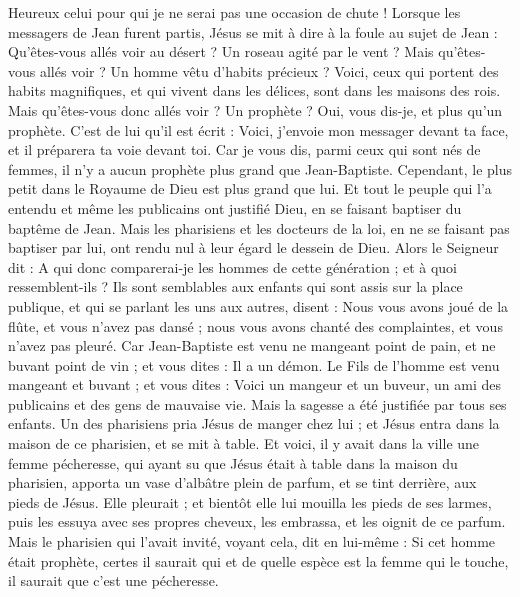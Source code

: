 \begin{multicols}{2}
Heureux celui pour qui je ne serai pas une occasion de chute !
Lorsque les messagers de Jean furent partis, Jésus se mit à dire à la foule au sujet de Jean : Qu'êtes-vous allés voir au désert ? Un roseau agité par le vent ?
Mais qu'êtes-vous allés voir ? Un homme vêtu d’habits précieux ? Voici, ceux qui portent des habits magnifiques, et qui vivent dans les délices, sont dans les maisons des rois.
Mais qu'êtes-vous donc allés voir ? Un prophète ? Oui, vous dis-je, et plus qu'un prophète.
C'est de lui qu'il est écrit : Voici, j'envoie mon messager devant ta face, et il préparera ta voie devant toi.
Car je vous dis, parmi ceux qui sont nés de femmes, il n'y a aucun prophète plus grand que Jean-Baptiste. Cependant, le plus petit dans le Royaume de Dieu est plus grand que lui.
Et tout le peuple qui l’a entendu et même les publicains ont justifié Dieu, en se faisant baptiser du baptême de Jean.
Mais les pharisiens et les docteurs de la loi, en ne se faisant pas baptiser par lui, ont rendu nul à leur égard le dessein de Dieu.
Alors le Seigneur dit : A qui donc comparerai-je les hommes de cette génération ; et à quoi ressemblent-ils ?
Ils sont semblables aux enfants qui sont assis sur la place publique, et qui se parlant les uns aux autres, disent : Nous vous avons joué de la flûte, et vous n'avez pas dansé ; nous vous avons chanté des complaintes, et vous n'avez pas pleuré.
Car Jean-Baptiste est venu ne mangeant point de pain, et ne buvant point de vin ; et vous dites : Il a un démon.
Le Fils de l'homme est venu mangeant et buvant ; et vous dites : Voici un mangeur et un buveur, un ami des publicains et des gens de mauvaise vie.
Mais la sagesse a été justifiée par tous ses enfants.
Un des pharisiens pria Jésus de manger chez lui ; et Jésus entra dans la maison de ce pharisien, et se mit à table.
Et voici, il y avait dans la ville une femme pécheresse, qui ayant su que Jésus était à table dans la maison du pharisien, apporta un vase d'albâtre plein de parfum,
et se tint derrière, aux pieds de Jésus. Elle pleurait ; et bientôt elle lui mouilla les pieds de ses larmes, puis les essuya avec ses propres cheveux, les embrassa, et les oignit de ce parfum.
Mais le pharisien qui l'avait invité, voyant cela, dit en lui-même : Si cet homme était prophète, certes il saurait qui et de quelle espèce est la femme qui le touche, il saurait que c’est une pécheresse.

\end{multicols}

